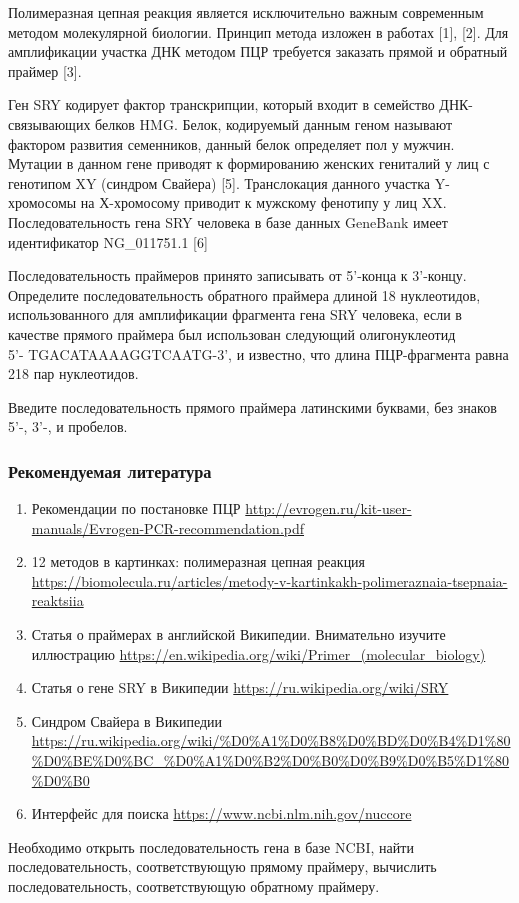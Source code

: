 
Полимеразная цепная реакция является исключительно важным современным методом молекулярной биологии. Принцип метода изложен в работах [1], [2]. Для амплификации участка ДНК методом ПЦР требуется заказать прямой и обратный праймер [3].

Ген SRY кодирует фактор транскрипции, который входит в семейство ДНК-связывающих белков HMG. 
Белок, кодируемый данным геном называют фактором развития семенников, данный белок определяет 
пол у мужчин. Мутации в данном гене приводят к формированию женских гениталий у лиц с генотипом 
XY (синдром Свайера) [5]. Транслокация данного участка Y-хромосомы на Х-хромосому приводит 
к мужскому фенотипу у лиц XX. Последовательность гена SRY человека в базе данных GeneBank 
имеет идентификатор NG\_011751.1 [6]

Последовательность праймеров принято записывать от 5'-конца к 3'-концу. Определите последовательность обратного праймера длиной 18 
нуклеотидов, использованного для амплификации фрагмента гена SRY человека, если в 
качестве прямого праймера был использован следующий олигонуклеотид\\ 5'- TGACATAAAAGGTCAATG-3', и известно, что длина ПЦР-фрагмента равна 218 пар нуклеотидов.

Введите последовательность прямого праймера латинскими буквами, без знаков 5'-, 3'-, и пробелов.

\subsubsection*{Рекомендуемая литература}

\begin{enumerate}
    \item Рекомендации по постановке ПЦР \url{http://evrogen.ru/kit-user-manuals/Evrogen-PCR-recommendation.pdf}
    \item 12 методов в картинках: полимеразная цепная реакция \url{https://biomolecula.ru/articles/metody-v-kartinkakh-polimeraznaia-tsepnaia-reaktsiia}
    \item Статья о праймерах в английской Википедии. Внимательно изучите иллюстрацию \url{https://en.wikipedia.org/wiki/Primer_(molecular_biology)}
    \item Статья о гене SRY в Википедии \url{https://ru.wikipedia.org/wiki/SRY}
    \item Синдром Свайера в Википедии \url{https://ru.wikipedia.org/wiki/%D0%A1%D0%B8%D0%BD%D0%B4%D1%80%D0%BE%D0%BC_%D0%A1%D0%B2%D0%B0%D0%B9%D0%B5%D1%}\linebreak \url{80%D0%B0}
    \item Интерфейс для поиска \url{https://www.ncbi.nlm.nih.gov/nuccore}
\end{enumerate}

\explanationSection

Необходимо открыть последовательность гена в базе NCBI, найти последовательность, соответствующую прямому праймеру, вычислить последовательность, соответствующую обратному праймеру.

